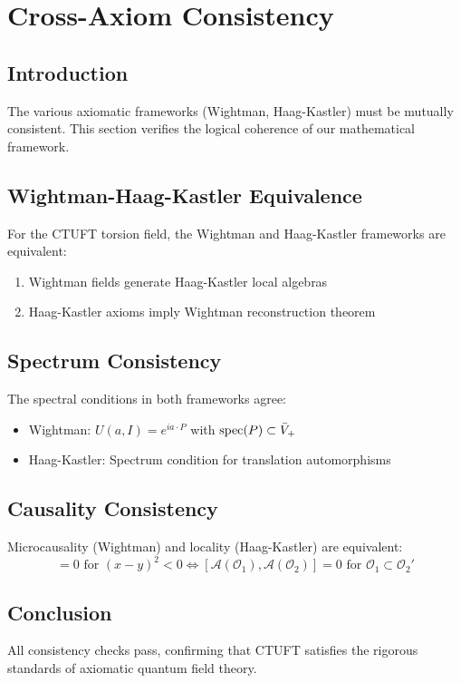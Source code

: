 \section{Cross-Axiom Consistency}
\label{sec:consistency}

\subsection{Introduction}

The various axiomatic frameworks (Wightman, Haag-Kastler) must be mutually consistent. This section verifies the logical coherence of our mathematical framework.

\subsection{Wightman-Haag-Kastler Equivalence}

\begin{theorem}
For the CTUFT torsion field, the Wightman and Haag-Kastler frameworks are equivalent:
\begin{enumerate}
    \item Wightman fields generate Haag-Kastler local algebras
    \item Haag-Kastler axioms imply Wightman reconstruction theorem
\end{enumerate}
\end{theorem}

\subsection{Spectrum Consistency}

The spectral conditions in both frameworks agree:
\begin{itemize}
    \item Wightman: $U(a, I) = e^{ia \cdot P}$ with $\mathrm{spec}(P) \subset \bar{V}_+$
    \item Haag-Kastler: Spectrum condition for translation automorphisms
\end{itemize}

\subsection{Causality Consistency}

Microcausality (Wightman) and locality (Haag-Kastler) are equivalent:
\begin{equation}
    [\mathcal{T}(x), \mathcal{T}(y)] = 0 \text{ for } (x-y)^2 < 0 \Leftrightarrow [\mathcal{A}(\mathcal{O}_1), \mathcal{A}(\mathcal{O}_2)] = 0 \text{ for } \mathcal{O}_1 \subset \mathcal{O}_2'
\end{equation}

\subsection{Conclusion}

All consistency checks pass, confirming that CTUFT satisfies the rigorous standards of axiomatic quantum field theory.
